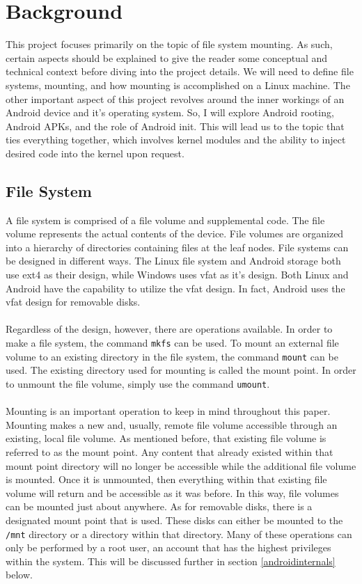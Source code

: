 \chapter{Background}
\label{background}
This project focuses primarily on the topic of file system mounting. As such, certain aspects should be explained to give the reader some conceptual and technical context before diving into the project details. We will need to define file systems, mounting, and how mounting is accomplished on a Linux machine. The other important aspect of this project revolves around the inner workings of an Android device and it's operating system. So, I will explore Android rooting, Android APKs, and the role of Android init. This will lead us to the topic that ties everything together, which involves kernel modules and the ability to inject desired code into the kernel upon request.
\section{File System}
A file system is comprised of a file volume and supplemental code. The file volume represents the actual contents of the device. File volumes are organized into a hierarchy of directories containing files at the leaf nodes. File systems can be designed in different ways. The Linux file system and Android storage both use ext4 as their design, while Windows uses vfat as it's design. Both Linux and Android have the capability to utilize the vfat design. In fact, Android uses the vfat design for removable disks. \\ \\
Regardless of the design, however, there are operations available. In order to make a file system, the command \verb|mkfs| can be used. To mount an external file volume to an existing directory in the file system, the command \verb|mount| can be used. The existing directory used for mounting is called the mount point. In order to unmount the file volume, simply use the command \verb|umount|. \\ \\
Mounting is an important operation to keep in mind throughout this paper. Mounting makes a new and, usually, remote file volume accessible through an existing, local file volume. As mentioned before, that existing file volume is referred to as the mount point. Any content that already existed within that mount point directory will no longer be accessible while the additional file volume is mounted. Once it is unmounted, then everything within that existing file volume will return and be accessible as it was before. In this way, file volumes can be mounted just about anywhere. As for removable disks, there is a designated mount point that is used. These disks can either be mounted to the \verb|/mnt| directory or a directory within that directory. Many of these operations can only be performed by a root user, an account that has the highest privileges within the system. This will be discussed further in section \ref{androidinternals} below.
